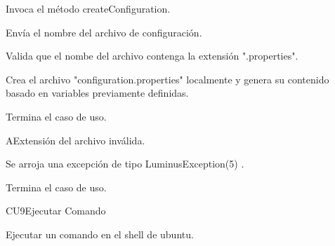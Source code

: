 
	\begin{UCtrayectoria}

		\UCpaso[\UCactor] Invoca el método createConfiguration.

		\UCpaso[\UCactor] Envía el nombre del archivo de configuración.

		\UCpaso[\UCsist] Valida que el nombe del archivo contenga la extensión ".properties". 

		\UCpaso[\UCsist] Crea el archivo "configuration.properties" localmente y genera su contenido basado en variables previamente definidas.

		\UCpaso[] Termina el caso de uso.

	\end{UCtrayectoria}




	\begin{UCtrayectoriaA}{A}{Extensión del archivo inválida.}

		\UCpaso[\UCsist] Se arroja una excepción de tipo LuminusException(5) .

		\UCpaso[] Termina el caso de uso.

	\end{UCtrayectoriaA}


	\begin{UseCase}{CU9}{Ejecutar Comando}{

		Ejecutar un comando en el shell de ubuntu.

	}















	\end{UseCase}


